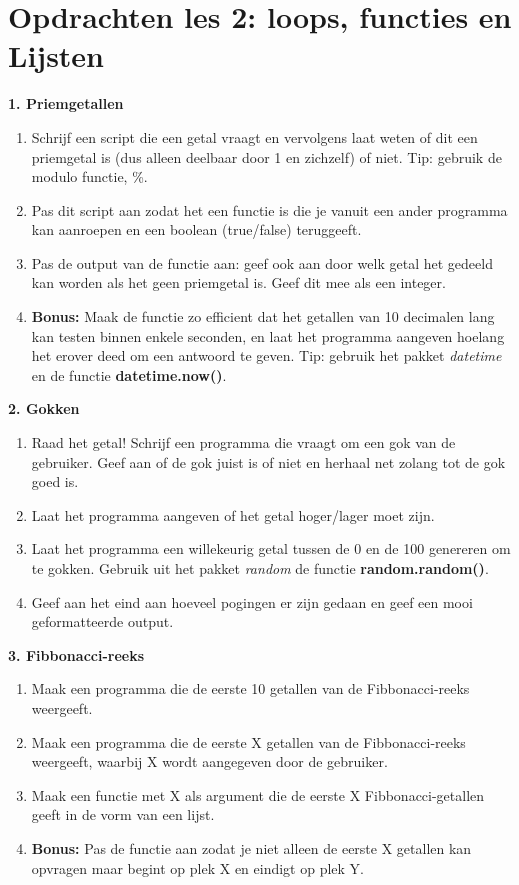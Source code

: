 \section{Opdrachten les 2: loops, functies en Lijsten}
\textbf{1. Priemgetallen}
\begin{enumerate}[label=\textbf{1.\alph*}]
\item Schrijf een script die een getal vraagt en vervolgens laat weten of dit een priemgetal is (dus alleen deelbaar door 1 en zichzelf) of niet. Tip: gebruik de modulo functie, \%. 
\item Pas dit script aan zodat het een functie is die je vanuit een ander programma kan aanroepen en een boolean (true/false) teruggeeft.
\item Pas de output van de functie aan: geef ook aan door welk getal het gedeeld kan worden als het geen priemgetal is. Geef dit mee als een integer. 
\item \textbf{Bonus:} Maak de functie zo efficient dat het getallen van 10 decimalen lang kan testen binnen enkele seconden, en laat het programma aangeven hoelang het erover deed om een antwoord te geven. Tip: gebruik het pakket \textit{datetime} en de functie \textbf{datetime.now()}. 
\end{enumerate}
\textbf{2. Gokken}
\begin{enumerate}[label=\textbf{2.\alph*}]
\item Raad het getal! Schrijf een programma die vraagt om een gok van de gebruiker. Geef aan of de gok juist is of niet en herhaal net zolang tot de gok goed is.
\item Laat het programma aangeven of het getal hoger/lager moet zijn.
\item Laat het programma een willekeurig getal tussen de 0 en de 100 genereren om te gokken. Gebruik uit het pakket \textit{random} de functie \textbf{random.random()}.
\item Geef aan het eind aan hoeveel pogingen er zijn gedaan en geef een mooi geformatteerde output. 
\end{enumerate}
\textbf{3. Fibbonacci-reeks}
\begin{enumerate}[label=\textbf{3.\alph*}]
\item Maak een programma die de eerste 10 getallen van de Fibbonacci-reeks weergeeft.
\item Maak een programma die de eerste X getallen van de Fibbonacci-reeks weergeeft, waarbij X wordt aangegeven door de gebruiker.
\item Maak een functie met X als argument die de eerste X Fibbonacci-getallen geeft in de vorm van een lijst.
\item \textbf{Bonus:} Pas de functie aan zodat je niet alleen de eerste X getallen kan opvragen maar begint op plek X en eindigt op plek Y. 
\end{enumerate}